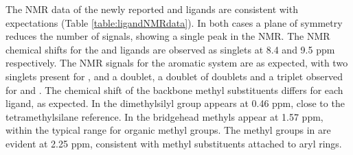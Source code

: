 

The NMR data of the newly reported \tButhixantphos{} and \tBusixantphos{} ligands are consistent with expectations (Table \ref{table:ligandNMRdata}).  In both cases a plane of symmetry reduces the number of signals, showing a single peak in the \phosphorus{} NMR.  The \phosphorus{} NMR chemical shifts for the \tBusixantphos{} and \tButhixantphos{} ligands are observed as singlets at 8.4 and 9.5 ppm respectively.  The \proton{} NMR signals for the aromatic system are as expected, with two singlets present for \tButhixantphos, and a doublet, a doublet of doublets and a triplet observed for \tBusixantphos{} and \tBuxantphos.  The chemical shift of the backbone methyl substituents differs for each ligand, as expected.  In \tBusixantphos{} the dimethylsilyl group appears at 0.46 ppm, close to the tetramethylsilane reference.  In \tBuxantphos{} the bridgehead methyls appear at 1.57 ppm, within the typical range for organic methyl groups.  The methyl groups in \tButhixantphos{} are evident at 2.25 ppm, consistent with methyl substituents attached to aryl rings.  

